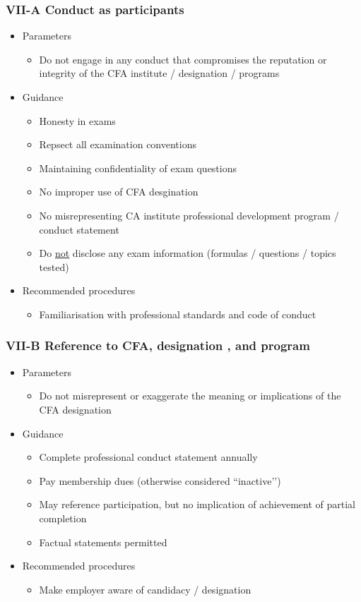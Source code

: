 \documentclass[../notes_compiled.tex]{subfiles}
\begin{document}
\subsubsection{VII-A Conduct as participants}
\begin{itemize}
\item Parameters
\begin{itemize}
\item Do not engage in any conduct that compromises the reputation or integrity of the CFA institute / designation / programs
\end{itemize}
\item Guidance
\begin{itemize}
\item Honesty in exams
\item Repsect all examination conventions
\item Maintaining confidentiality of exam questions
\item No improper use of CFA desgination
\item No misrepresenting CA institute professional development program / conduct statement
\item Do \underline{not} disclose any exam information (formulas / questions / topics tested)
\end{itemize}
\item Recommended procedures
\begin{itemize}
\item Familiarisation with professional standards and code of conduct
\end{itemize}
\end{itemize}
\subsubsection{VII-B Reference to CFA, designation , and program}
\begin{itemize}
\item Parameters
\begin{itemize}
\item Do not misrepresent or exaggerate the meaning or implications of the CFA designation
\end{itemize}
\item Guidance
\begin{itemize}
\item Complete professional conduct statement annually
\item Pay membership dues (otherwise considered ``inactive’’)
\item May reference participation, but no implication of achievement of partial completion
\item Factual statements permitted
\end{itemize}
\item Recommended procedures
\begin{itemize}
\item Make employer aware of candidacy / designation
\end{itemize}
\end{itemize}
\end{document}
